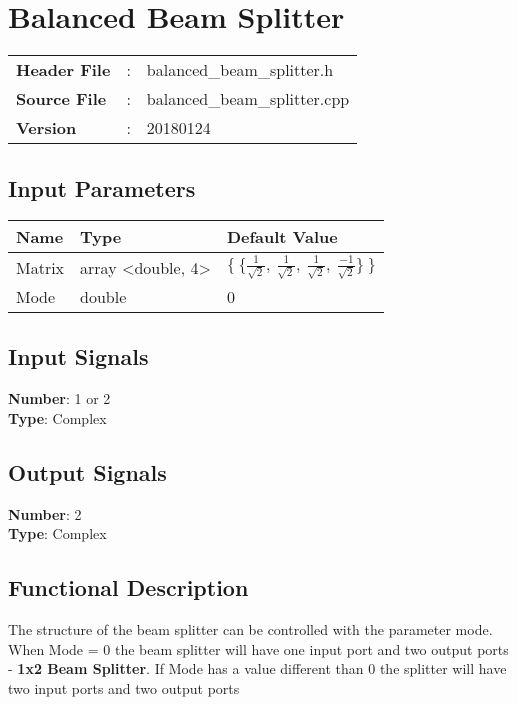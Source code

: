 \clearpage

\section{Balanced Beam Splitter}

\begin{tcolorbox}	
\begin{tabular}{p{2.75cm} p{0.2cm} p{10.5cm}} 	
\textbf{Header File}   &:& balanced\_beam\_splitter.h \\
\textbf{Source File}   &:& balanced\_beam\_splitter.cpp \\
\textbf{Version}       &:& 20180124
\end{tabular}
\end{tcolorbox}

\subsection*{Input Parameters}

\begin{table}[H]
\centering
\begin{tabular}{|l|l|l|}
\hline
Name           & Type    & Default Value     \\ \hline
Matrix         & array <double, 4> & $\lbrace~\lbrace \frac{1}{\sqrt{2}},~\frac{1}{\sqrt{2}},~\frac{1}{\sqrt{2}},~\frac{-1}{\sqrt{2}} \rbrace~\rbrace$                             \\ \hline
Mode           & double  & 0                 \\ \hline
\end{tabular}
\end{table}

\subsection*{Input Signals}

\textbf{Number}: 1 or 2\\
\textbf{Type}: Complex

\subsection*{Output Signals}

\textbf{Number}: 2\\
\textbf{Type}: Complex

\subsection*{Functional Description}
The structure of the beam splitter can be controlled with the parameter mode. When Mode = 0 the beam splitter will have one input port and two output ports - \textbf{1x2 Beam Splitter}. If Mode has a value different than 0 the splitter will have two input ports and two output ports 


